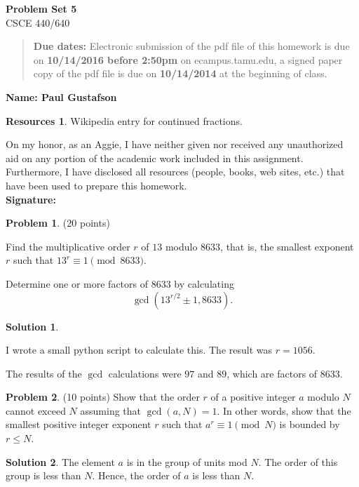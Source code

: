 \documentclass{article}
\theoremstyle{definition}
\newtheorem{problem}{Problem}
\newtheorem*{solution}{Solution}
\newtheorem*{resources}{Resources}
\newcommand{\name}[1]{\noindent\textbf{Name: #1}}
\newcommand{\honor}{\noindent On my honor, as an Aggie, I have neither
  given nor received any unauthorized aid on any portion of the
  academic work included in this assignment. Furthermore, I have
  disclosed all resources (people, books, web sites, etc.) that have
  been used to prepare this homework. \\[1ex]
 \textbf{Signature:} \underline{\hspace*{5cm}} }
\newcommand{\problemset}[1]{\begin{center}\textbf{Problem Set #1}\\ 
CSCE 440/640\end{center}}
\newcommand{\duedate}[2]{\begin{quote}\textbf{Due dates:} Electronic
    submission of the pdf file of this homework is due on \textbf{#1} on ecampus.tamu.edu, a signed paper copy
    of the pdf file is due on \textbf{#2} at the beginning of
    class. \end{quote} }
\begin{document}
\problemset{5}
\duedate{10/14/2016 before 2:50pm}{10/14/2014}
\name{ Paul Gustafson }
\begin{resources} 
Wikipedia entry for continued fractions.
\end{resources}
\honor

\newpage

\noindent 
\begin{problem} (20 points) 
\begin{compactenum}[(a)]  
\item Find the multiplicative order $r$ of $13$ modulo $8633$, that is, the smallest exponent $r$ such that $13^r\equiv 1\pmod{8633}$.
\item Determine one or more factors of $8633$ by calculating 
$$ \gcd(13^{r/2}\pm 1, 8633).$$
\end{compactenum}
\end{problem}
\begin{solution}
\begin{compactenum}[(a)]  
\item I wrote a small python script to calculate this.  The result was $r = 1056$.
\item The results of the $\gcd$ calculations were $97$ and $89$, which are factors of $8633$.
\end{compactenum}
\end{solution}

\begin{problem} (10 points) 
Show that the order $r$ of a positive integer $a$ modulo $N$ cannot exceed $N$ assuming that $\gcd(a,N)=1$. In other words, show that the smallest positive integer exponent $r$ such that $a^r\equiv 1 \pmod N$ is bounded by $r\le N$. 
\end{problem}
\begin{solution}
The element $a$ is in the group of units mod $N$.  The order of this group is less than $N$. Hence, the order of $a$ is less than $N$.
\end{solution}
\end{document}
